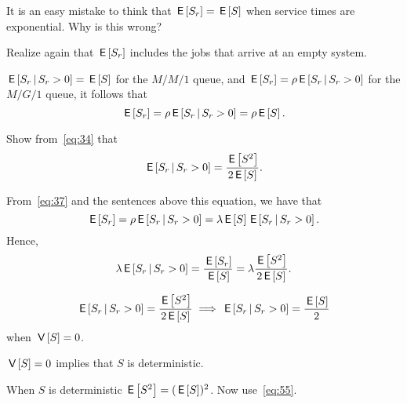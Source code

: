 \begin{extra}
  It is an easy mistake to think that $\,\mathsf{E}\left[S_r\right] = \,\mathsf{E}\left[S\right]$ when service
  times are exponential. Why is this wrong?
  \begin{hint}
Realize again that $\,\mathsf{E}\left[S_r\right]$ includes the jobs that arrive at an empty system.
  \end{hint}
  \begin{solution}

    $\,\mathsf{E}\left[S_r \,\middle|\, S_r>0\right] = \,\mathsf{E}\left[S\right]$ for the $M/M/1$ queue, and
    $\,\mathsf{E}\left[S_r\right] = \rho \,\mathsf{E}\left[S_r \,\middle|\, S_r>0\right]$ for the $M/G/1$ queue, it
    follows that
  \begin{equation*}
 \,\mathsf{E}\left[S_r\right] = \rho \,\mathsf{E}\left[S_r\,\middle|\, S_r>0\right] = \rho \,\mathsf{E}\left[S\right].
  \end{equation*}
  \end{solution}
\end{extra}




\begin{exercise} \label{ex:9}
Show from~\cref{eq:34} that 
\begin{equation}\label{eq:55}
\,\mathsf{E}\left[S_r\,\middle|\, S_r>0\right] = \frac{\,\mathsf{E}\left[S^2\right]}{2 \,\mathsf{E}\left[S\right]}.
\end{equation}
\begin{solution}
 From~\cref{eq:37} and the sentences above this equation,
    we have that
    \begin{equation*}
    \,\mathsf{E}\left[S_r\right] = \rho \,\mathsf{E}\left[S_r\,\middle|\, S_r>0\right]=\lambda \,\mathsf{E}\left[S\right] \,\mathsf{E}\left[S_r\,\middle|\, S_r>0\right].
    \end{equation*}
Hence,
    \begin{equation*}
    \lambda \,\mathsf{E}\left[S_r\,\middle|\, S_r>0\right] = \frac{\,\mathsf{E}\left[S_r\right]}{\,\mathsf{E}\left[S\right]} = \lambda \frac{\,\mathsf{E}\left[S^2\right]}{2 \,\mathsf{E}\left[S\right]}.
    \end{equation*}
\end{solution}
\end{exercise}


\begin{extra}[\faBalanceScale]\label{ex:45}
\begin{equation*}
\,\mathsf{E}\left[S_r\,\middle|\, S_r>0\right] = \frac{\,\mathsf{E}\left[S^2\right]}{2 \,\mathsf{E}\left[S\right]} \implies \,\mathsf{E}\left[S_r\,\middle|\, S_r>0\right] = \frac{\,\mathsf{E}\left[S\right]} 2
\end{equation*}
when $\,\mathsf{V}\left[S\right] = 0$. 
  \begin{hint}
    $\,\mathsf{V}\left[S\right] = 0$ implies that $S$ is deterministic.
  \end{hint}
\begin{solution}
 When $S$ is deterministic $\,\mathsf{E}\left[S^2\right] = (\,\mathsf{E}\left[S\right])^2$.  Now use~\cref{eq:55}.
\end{solution}
\end{extra}

